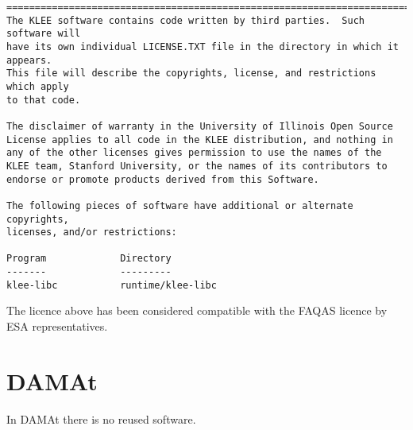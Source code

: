 \begin{lstlisting}[language={}]
==============================================================================
The KLEE software contains code written by third parties.  Such software will
have its own individual LICENSE.TXT file in the directory in which it appears.
This file will describe the copyrights, license, and restrictions which apply
to that code.

The disclaimer of warranty in the University of Illinois Open Source
License applies to all code in the KLEE distribution, and nothing in
any of the other licenses gives permission to use the names of the
KLEE team, Stanford University, or the names of its contributors to
endorse or promote products derived from this Software.

The following pieces of software have additional or alternate copyrights,
licenses, and/or restrictions:

Program             Directory
-------             ---------
klee-libc           runtime/klee-libc
\end{lstlisting}

The licence above has been considered compatible with the FAQAS licence by ESA representatives.

\section{DAMAt}
\label{sec:damat:reuse}

In DAMAt there is no reused software.

